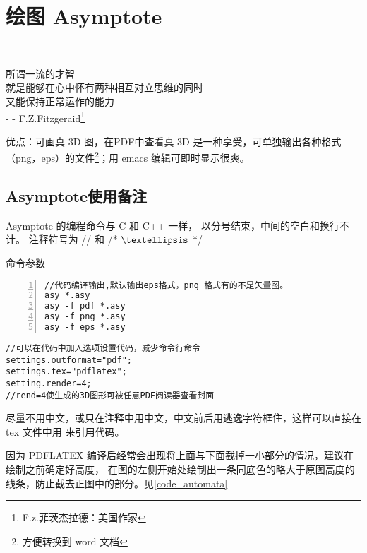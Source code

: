 \chapter{绘图  Asymptote}
\thispagestyle{fancy}

~\\[9cm]
\begin{flushright}
\kai\xiaosi
\textcolor[rgb]{0.00,0.50,0.00}{
所谓一流的才智\\
就是能够在心中怀有两种相互对立思维的同时\\
又能保持正常运作的能力\\
- - F.Z.Fitzgeraid\footnote{F.z.菲茨杰拉德：美国作家}}
\end{flushright}
\clearpage

优点：可画真 3D 图，在PDF中查看真 3D 是一种享受，\textcolor[rgb]{0.00,0.00,1.00}{可单独输出各种格式（png，eps）的文件\footnote{方便转换到 word 文档}}；用 emacs 编辑可即时显示很爽。

\section{Asymptote使用备注}

Asymptote 的编程命令与 C 和 C++ 一样，
以分号结束，中间的空白和换行不计。
注释符号为
//
和
/*
$\textellipsis$
*/

命令参数\\
\begin{Verbatim}[formatcom=\color{grass},frame=single,numbers=left]
//代码编译输出,默认输出eps格式，png 格式有的不是矢量图。
asy *.asy
asy -f pdf *.asy
asy -f png *.asy
asy -f eps *.asy
\end{Verbatim}

\begin{Verbatim}[formatcom=\color{grass},frame=single]
//可以在代码中加入选项设置代码，减少命令行命令
settings.outformat="pdf";
settings.tex="pdflatex";
setting.render=4;
//rend=4使生成的3D图形可被任意PDF阅读器查看封面
\end{Verbatim}

尽量不用中文，或只在注释中用中文，中文前后用逃逸字符框住，这样可以直接在 tex 文件中用 \verb||来引用代码。

因为 PDFLATEX 编译后经常会出现将上面与下面截掉一小部分的情况，建议在绘制之前确定好高度，
在图的左侧开始处绘制出一条同底色的略大于原图高度的线条，防止截去正图中的部分。见\ref{code_automata}

